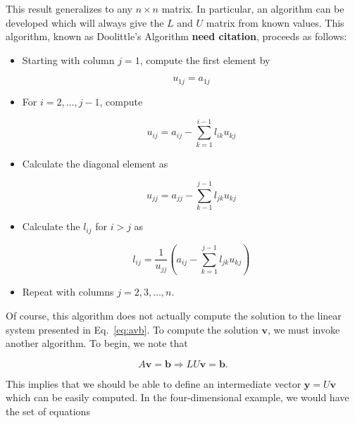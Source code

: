 \documentclass[12pt]{article}
\numberwithin{equation}{section}
\begin{document}
\noindent This result generalizes to any $n\times n$ matrix.  In particular, an algorithm can be developed which will always give the $L$ and $U$ matrix from known values.  This algorithm, known as Doolittle's Algorithm \textbf{need citation}, proceeds as follows:

\begin{itemize}
\item Starting with column $j=1$, compute the first element by 

\begin{equation}
\label{eq:ludecomp1}
u_{1j}=a_{1j}
\end{equation}

\item For $i=2,\ldots,j-1$, compute

\begin{equation}
\label{eq:ludecomp2}
u_{ij}=a_{ij}-\sum_{k=1}^{i-1}l_{ik}u_{kj}
\end{equation}

\item Calculate the diagonal element as

\begin{equation}
\label{eq:ludecomp3}
u_{jj}=a_{jj}-\sum_{k-1}^{j-1} l_{jk}u_{kj}
\end{equation}

\item Calculate the $l_{ij}$ for $i>j$ as

\begin{equation}
\label{eq:ludecomp4}
l_{ij}=\frac{1}{u_{jj}}\left(a_{ij}-\sum_{k=1}^{j-1} l_{jk}u_{kj}\right)
\end{equation}

\item Repeat with columns $j=2,3,\ldots,n$.
\end{itemize}

\noindent Of course, this algorithm does not actually compute the solution to the linear system presented in Eq.~\ref{eq:avb}.  To compute the solution $\textbf{v}$, we must invoke another algorithm.  To begin, we note that

\begin{equation}
\label{eq:axbluxb}
A\textbf{v}=\textbf{b}\Rightarrow LU\textbf{v}=\textbf{b}.
\end{equation}

\noindent This implies that we should be able to define an intermediate vector $\textbf{y}=U\textbf{v}$ which can be easily computed.  In the four-dimensional example, we would have the set of equations
\end{document}

